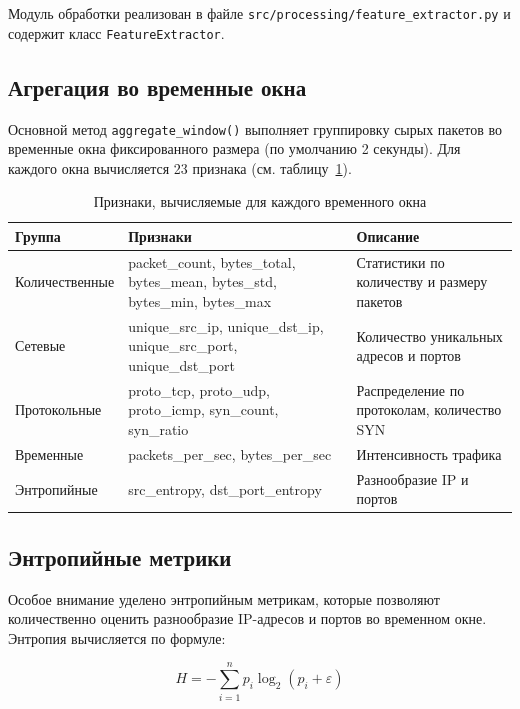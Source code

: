 Модуль обработки реализован в файле \texttt{src/processing/feature\_extractor.py} и содержит класс \texttt{FeatureExtractor}.

\subsection{Агрегация во временные окна}

Основной метод \texttt{aggregate\_window()} выполняет группировку сырых пакетов во временные окна фиксированного размера (по умолчанию 2 секунды). Для каждого окна вычисляется 23 признака (см. таблицу~\ref{tab:features}).

\begin{table}[H]
\centering
\caption{Признаки, вычисляемые для каждого временного окна}
\label{tab:features}
\begin{tabular}{p{4cm}p{4.5cm}p{6cm}}
\toprule
\textbf{Группа} & \textbf{Признаки} & \textbf{Описание} \\
\midrule
Количественные & packet\_count, bytes\_total, bytes\_mean, bytes\_std, bytes\_min, bytes\_max & Статистики по количеству и размеру пакетов \\
\addlinespace
Сетевые & unique\_src\_ip, unique\_dst\_ip, unique\_src\_port, unique\_dst\_port & Количество уникальных адресов и портов \\
\addlinespace
Протокольные & proto\_tcp, proto\_udp, proto\_icmp, syn\_count, syn\_ratio & Распределение по протоколам, количество SYN \\
\addlinespace
Временные & packets\_per\_sec, bytes\_per\_sec & Интенсивность трафика \\
\addlinespace
Энтропийные & src\_entropy, dst\_port\_entropy & Разнообразие IP и портов \\
\bottomrule
\end{tabular}
\end{table}

\subsection{Энтропийные метрики}

Особое внимание уделено энтропийным метрикам, которые позволяют количественно оценить разнообразие IP-адресов и портов во временном окне. Энтропия вычисляется по формуле:

\begin{equation}
\label{eq:entropy}
H = -\sum_{i=1}^{n} p_i \log_2(p_i + \varepsilon)
\end{equation}


